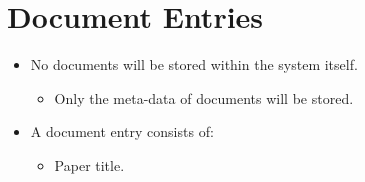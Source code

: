 \documentclass{article}
\begin{document}
\section{Document Entries}\label{sec:docs}
	\begin{itemize}
		\item No documents will be stored within the system itself.
		\begin{itemize}
			\item Only the meta-data of documents will be stored.
		\end{itemize}
		\item A document entry consists of:
		\begin{itemize}
			\item Paper title.
		\end{itemize}
	\end{itemize}
	
\end{document}
